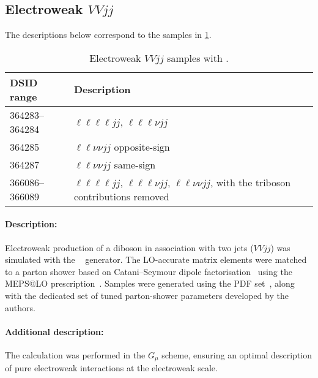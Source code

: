 


\subsection[Electroweak VVjj]{Electroweak $VVjj$}

The descriptions below correspond to the samples in
\cref{tab:MB-sherpa-vvjj}.

\begin{table}[htbp]
  \caption{Electroweak $VVjj$ samples with \SHERPA.}%
  \label{tab:MB-sherpa-vvjj}
  \centering
  \begin{tabular}{l l}
    \toprule
    DSID range & Description \\
    \midrule
    364283--364284   & $\ell\ell\ell\ell jj$, $\ell\ell\ell\nu jj$\\
    364285   &  $\ell\ell\nu\nu jj$ opposite-sign\\
    364287   &  $\ell\ell\nu\nu jj$ same-sign\\
    366086--366089   &  $\ell\ell\ell\ell jj$, $\ell\ell\ell\nu jj$, $\ell\ell\nu\nu jj$, with the triboson contributions removed\\
    \bottomrule
  \end{tabular}
\end{table}

\paragraph{Description:}

Electroweak production of a diboson in association with two jets
($VVjj$) was simulated with the \SHERPA[2.2.2]~\cite{Bothmann:2019yzt}
generator. The LO-accurate matrix elements were matched to a parton
shower based on Catani--Seymour dipole factorisation~\cite{Gleisberg:2008fv,Schumann:2007mg} using the MEPS@LO
prescription~\cite{Hoeche:2011fd,Hoeche:2012yf,Catani:2001cc,Hoeche:2009rj}.
Samples were generated using the \NNPDF[3.0nnlo] PDF set~\cite{Ball:2014uwa},
along with the dedicated set of tuned parton-shower parameters
developed by the \SHERPA authors.

\paragraph{Additional description:} The calculation was performed in the
$G_\mu$ scheme, ensuring an optimal description of pure
electroweak interactions at the electroweak scale.

